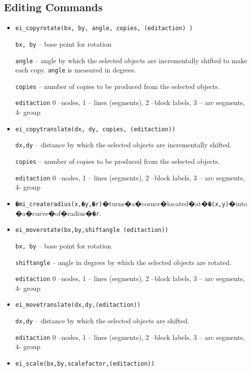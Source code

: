 \subsection{Editing Commands}
\begin{itemize}

\item \texttt{ei\_copyrotate(bx, by, angle, copies, (editaction) )}

\texttt{bx, by} -- base point for rotation

\texttt{angle} -- angle by which the selected objects are incrementally
shifted to make each copy. \texttt{angle} is measured in degrees.

\texttt{copies} -- number of copies to be produced from the selected
objects.

\texttt{editaction} 0 --nodes, 1 -- lines (segments), 2 --block labels, 3 --
arc segments, 4- group

\item \texttt{ei\_copytranslate(dx, dy, copies, (editaction))}

\texttt{dx,dy} -- distance by which the selected objects are incrementally
shifted.

\texttt{copies} -- number of copies to be produced from the selected
objects.

\texttt{editaction} 0 --nodes, 1 -- lines (segments), 2 --block labels, 3 --
arc segments, 4- group

\item{\tt�mi\_createradius(x,�y,�r)}�turns�a�corner�located�at�{\tt�(x,y)}�into�a�curve�of�radius�{\tt�r}.

\item \texttt{ei\_moverotate(bx,by,shiftangle (editaction))}

\texttt{bx, by} -- base point for rotation

\texttt{shiftangle} -- angle in degrees by which the selected objects are
rotated.

\texttt{editaction} 0 --nodes, 1 -- lines (segments), 2 --block labels, 3 --
arc segments, 4- group

\item \texttt{ei\_movetranslate(dx,dy,(editaction))}

\texttt{dx,dy} -- distance by which the selected objects are shifted.

\texttt{editaction} 0 --nodes, 1 -- lines (segments), 2 --block labels, 3 --
arc segments, 4- group

\item \texttt{ei\_scale(bx,by,scalefactor,(editaction))}


\end{itemize}
